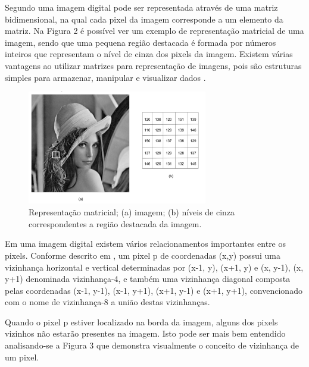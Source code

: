 Segundo  uma imagem digital pode ser representada através de uma matriz bidimensional, na qual cada pixel da imagem corresponde a um elemento da matriz. Na Figura 2 é possível ver um exemplo de representação matricial de uma imagem, sendo que uma pequena região destacada é formada por números inteiros que representam o nível de cinza dos pixels da imagem. Existem várias vantagens ao utilizar matrizes para representação de imagens, pois são estruturas simples para armazenar, manipular e visualizar dados \cite{PEDRINI2008}. 

 \begin{figure}[h!]
	\centering
	\includegraphics[width=0.7\textwidth]{Imagens/imagem6} 
	\caption[Representação matricial;]{Representação matricial; (a) imagem; (b) níveis de cinza correspondentes a região
destacada da imagem.}
	\label{fig:tux_laplace}
\end{figure}


Em uma imagem digital existem vários relacionamentos importantes entre os pixels. Conforme descrito em , 
um pixel p de coordenadas (x,y) possui uma vizinhança horizontal e vertical determinadas por (x-1, y), (x+1, y) e (x, y-1), (x, y+1) denominada vizinhança-4, e também uma vizinhança diagonal composta pelas coordenadas (x-1, y-1), (x-1, y+1), (x+1, y-1) e (x+1, y+1), convencionado com o nome de vizinhança-8 a união destas vizinhanças.

Quando o pixel p estiver localizado na borda da imagem, alguns dos pixels vizinhos não estarão presentes na imagem. Isto pode ser mais bem entendido analisando-se a Figura 3 que demonstra visualmente o conceito de vizinhança de um pixel.

